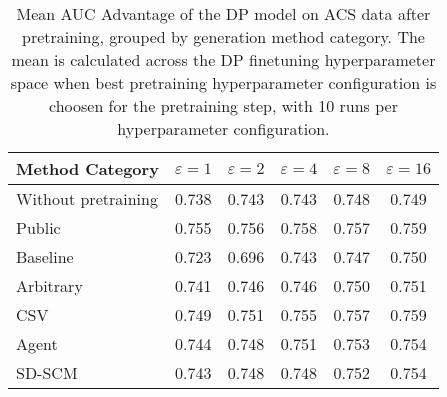 \begin{table}[h!]
    \centering
    \caption{Mean AUC Advantage of the DP model on ACS data after pretraining, grouped by generation method category. The mean is calculated across the DP finetuning hyperparameter space when best pretraining hyperparameter configuration is choosen for the pretraining step, with 10 runs per hyperparameter configuration.}
    \label{tab:epsilon_comparison}
    \begin{tabular}{lccccc}
    \toprule
    Method Category & $\varepsilon=1$ & $\varepsilon=2$ & $\varepsilon=4$ & $\varepsilon=8$ & $\varepsilon=16$ \\
    \midrule
    Without pretraining & 0.738 & 0.743 & 0.743 & 0.748 & 0.749 \\
    \arrayrulecolor{black!50!}\midrule
    Public & \cellcolor{gold!30}0.755 & \cellcolor{gold!30}0.756 & \cellcolor{gold!30}0.758 & \cellcolor{gold!30}0.757 & \cellcolor{gold!30}0.759 \\
    \arrayrulecolor{black!50!}\midrule
    Baseline & 0.723 & 0.696 & 0.743 & 0.747 & 0.750 \\
    \arrayrulecolor{black!50!}\midrule
    Arbitrary & 0.741 & 0.746 & 0.746 & 0.750 & \cellcolor{bronze!30}0.751 \\
    \arrayrulecolor{black!50!}\midrule
    CSV & \cellcolor{silver!30}0.749 & \cellcolor{silver!30}0.751 & \cellcolor{silver!30}0.755 & \cellcolor{gold!30}0.757 & \cellcolor{gold!30}0.759 \\
    Agent & \cellcolor{bronze!30}0.744 & \cellcolor{bronze!30}0.748 & \cellcolor{bronze!30}0.751 & \cellcolor{silver!30}0.753 & \cellcolor{silver!30}0.754 \\
    SD-SCM & 0.743 & \cellcolor{bronze!30}0.748 & 0.748 & \cellcolor{bronze!30}0.752 & \cellcolor{silver!30}0.754 \\
    \bottomrule
    \end{tabular}
\end{table}